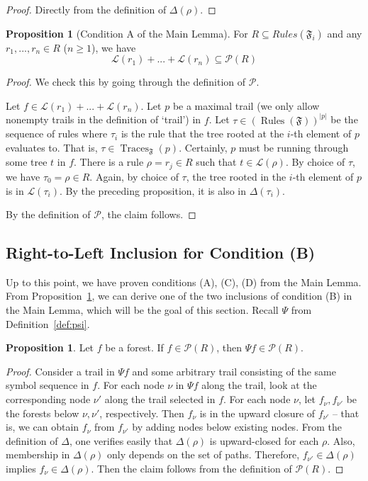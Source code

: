 \documentclass[sigplan,9pt]{acmart}\settopmatter{printfolios=true,printccs=false,printacmref=false}
\newcounter{thm}
\newcounter{theorem}
\theoremstyle{definition}
\newtheorem{prop}[thm]{Proposition}
\newcommand{\La}[0]{{\mathcal{L}}}
\newcommand{\Ff}[0]{{\mathfrak{F}}}
\newcommand{\Pa}[0]{{\mathcal{P}}}
\begin{document}
\begin{proof}
Directly from the definition of $\Delta(\rho)$.
\end{proof}


\begin{prop}[Condition A of the Main Lemma]\label{prop:correctness}
For $R \subseteq Rules(\Ff_i)$ and any $r_1, ..., r_n \in R$ ($n \geq 1$), we have 
$$\La(r_1) + ... + \La(r_n) \subseteq \Pa(R)$$
\end{prop}


\begin{proof}
We check this by going through the definition of $\Pa$.

Let $f \in \La(r_1) + ... + \La(r_n)$.
Let $p$ be a maximal trail (we only allow nonempty trails in the definition of `trail') in $f$.
Let $\tau \in (\operatorname{Rules}(\Ff))^{|p|}$ be the sequence of rules where $\tau_i$ is the rule that the tree rooted at the $i$-th element of $p$ evaluates to.
That is, $\tau \in \operatorname{Traces}_\Ff(p)$.
Certainly, $p$ must be running through some tree $t$ in $f$.
There is a rule $\rho = r_j \in R$ such that $t \in \La(\rho)$.
By choice of $\tau$, we have $\tau_0 = \rho \in R$.
Again, by choice of $\tau$, the tree rooted in the $i$-th element of $p$ is in $\La(\tau_i)$.
By the preceding proposition, it is also in $\Delta(\tau_i)$.

By the definition of $\Pa$, the claim follows.
\end{proof}



\subsection{Right-to-Left Inclusion for Condition (B)}

Up to this point, we have proven conditions (A), (C), (D) from the Main Lemma.
From Proposition~\ref{prop:correctness}, we can derive one of the two inclusions of condition (B) in the Main Lemma, which will be the goal of this section.
Recall $\Psi$ from Definition~\ref{def:psi}.

\begin{prop}\label{prop:transfer-psi}
Let $f$ be a forest.
If $f \in \Pa(R)$, then $\Psi f \in \Pa(R)$.
\end{prop}

\begin{proof}
Consider a trail in $\Psi f$ and some arbitrary trail consisting of the same symbol sequence in $f$.
For each node $\nu$ in $\Psi f$ along the trail, look at the corresponding node $\nu'$ along the trail selected in $f$.
For each node $\nu$, let $f_\nu, f_{\nu'}$ be the forests below $\nu, \nu'$, respectively.
Then $f_\nu$ is in the upward closure of $f_{\nu'}$ -- that is, we can obtain $f_\nu$ from $f_{\nu'}$ by adding nodes below existing nodes.
From the definition of $\Delta$, one verifies easily that $\Delta(\rho)$ is upward-closed for each $\rho$.
Also, membership in $\Delta(\rho)$ only depends on the set of paths.
Therefore, $f_{\nu'} \in \Delta(\rho)$ implies $f_\nu \in \Delta(\rho)$.
Then the claim follows from the definition of $\Pa(R)$.
\end{proof}
\end{document}
